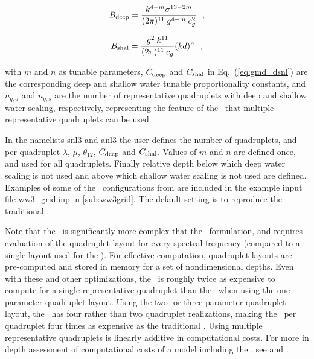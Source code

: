 \begin{equation}
B_{\rm{deep}} = \frac{k^{4+m} \sigma^{13-2m} }{(2\pi)^{11} \:
                 g^{4-m} \: c_g^2 } \:\:\: , \label{eq:gmd_B_deep}
\end{equation}

\begin{equation}
B_{\rm{shal}} = \frac{g^2 \: k^{11}}{(2\pi)^{11} \: c_g} (kd)^n
\:\:\: , \label{eq:gmd_B_shal}
\end{equation}

\noindent
with $m$ and $n$ as tunable parameters, $C_{\rm{deep}}$ and $C_{\rm{shal}}$
in Eq.~(\ref{eq:gmd_dsnl}) are the corresponding deep and shallow water tunable proportionality
constants, and $n_{q,d}$ and $n_{q,s}$ are the number of representative
quadruplets with deep and shallow water scaling, respectively, representing
the feature of the \gmd\ that multiple representative quadruplets can be used.

In the namelists {\F snl3} and {\F anl3} the user defines the number of
quadruplets, and per quadruplet $\lambda$, $\mu$, $\theta_{12}$,
$C_{\rm{deep}}$ and $C_{\rm{shal}}$. Values of $m$ and $n$ are defined once,
and used for all quadruplets. Finally relative depth below which deep water
scaling is not used and above which shallow water scaling is not used are
defined. Examples of some of the \gmd\ configurations from \cite{tol:MMAB10d}
are included in the example input file {\file ww3\_grid.inp}
in \para\ref{sub:ww3grid}. The default setting is to reproduce the traditional
\dia.

Note that the \gmd\ is significantly more complex that the \dia\ formulation,
and requires evaluation of the quadruplet layout for every spectral frequency
(compared to a single layout used for the \dia). For effective computation,
quadruplet layouts are pre-computed and stored in memory for a set of
nondimensional depths. Even with these and other optimizations, the \gmd\ is
roughly twice as expensive to compute for a single representative quadruplet
than the \dia\ when using the one-parameter quadruplet layout. Using the two-
or three-parameter quadruplet layout, the \gmd\ has four rather than two
quadruplet realizations, making the \gmd\ per quadruplet four times as
expensive as the traditional \dia. Using multiple representative quadruplets
is linearly additive in computational costs. For more in depth assessment of
computational costs of a model including the \gmd, see \cite{tol:MMAB10d} and
\cite{tol:OMOD13d}.
